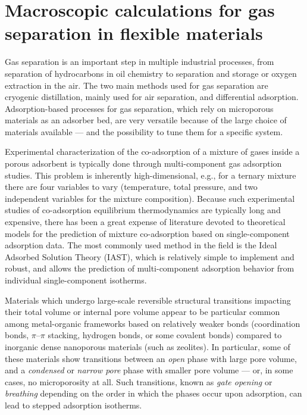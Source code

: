 \documentclass[thesis]{subfiles}
\begin{document}
\section{Macroscopic calculations for gas separation in flexible materials}

Gas separation is an important step in multiple industrial processes, from
separation of hydrocarbons in oil chemistry to  separation and storage
or oxygen extraction in the air. The two main methods used for gas separation
are cryogenic distillation, mainly used for air separation, and differential
adsorption. Adsorption-based processes for gas separation, which rely on
microporous materials as an adsorber bed, are very versatile because of the
large choice of materials available --- and the possibility to tune them for a
specific system.

Experimental characterization of the co-adsorption of a mixture of gases inside
a porous adsorbent is typically done through multi-component gas adsorption
studies. This problem is inherently high-dimensional, e.g., for a ternary
mixture there are four variables to vary (temperature, total pressure, and two
independent variables for the mixture composition). Because such experimental
studies of co-adsorption equilibrium thermodynamics are typically long and
expensive, there has been a great expense of literature devoted to theoretical
models for the prediction of mixture co-adsorption based on single-component
adsorption data. The most commonly used method in the field is the Ideal
Adsorbed Solution Theory (IAST)\cite{Myers1965}, which is relatively simple to
implement and robust, and allows the prediction of multi-component adsorption
behavior from individual single-component isotherms.

Materials which undergo large-scale reversible structural transitions impacting
their total volume or internal pore volume appear to be particular common among
metal-organic frameworks based on relatively weaker bonds (coordination bonds,
$\pi$--$\pi$ stacking, hydrogen bonds, or some covalent bonds) compared to
inorganic dense nanoporous materials (such as zeolites). In particular, some of
these materials show transitions between an \emph{open} phase with large pore
volume, and a \emph{condensed} or \emph{narrow pore} phase with smaller pore
volume --- or, in some cases, no microporosity at all. Such transitions, known
as \emph{gate opening}\cite{Kitaura2003, Tanaka2008, Li2015} or
\emph{breathing}\cite{Serre2002} depending on the order in which the phases
occur upon adsorption, can lead to stepped adsorption isotherms.
\end{document}
